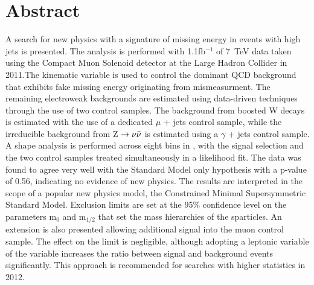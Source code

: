 \chapter*{Abstract}
\noindent 
\vspace{10mm}
\normalsize

A search for new physics with a signature of missing energy in events with high \Pt jets is presented. The analysis is performed with 1.1fb$^{-1}$ of 7~TeV data taken using the Compact Muon Solenoid detector at the Large Hadron Collider in 2011.The kinematic variable \alt is used to control the dominant QCD background that exhibits fake missing energy originating from mismeasurment. The remaining electroweak backgrounds are estimated using data-driven techniques through the use of two control samples. The background from boosted W decays is estimated with the use of a dedicated $\mu$ + jets control sample, while the irreducible background from Z $\rightarrow \nu \bar{\nu}$ is estimated using a $\gamma$ + jets control sample.  A shape analysis is performed across eight bins in \HT, with the signal selection and the two control samples treated simultaneously in a likelihood fit.  The data was found to agree very well with the Standard Model only hypothesis with a p-value of 0.56, indicating no evidence of new physics. The results are interpreted in the scope of a popular new physics model, the Constrained Minimal Supersymmetric Standard Model. Exclusion limits are set at the 95\% confidence level on the parameters m$_{0}$ and m$_{1/2}$ that set the mass hierarchies of the sparticles. An extension is also presented allowing additional signal into the muon control sample. The effect on the limit is negligible, although adopting a leptonic variable of the \alt variable increases the ratio between signal and background events significantly. This approach is recommended for searches with higher statistics in 2012. 



